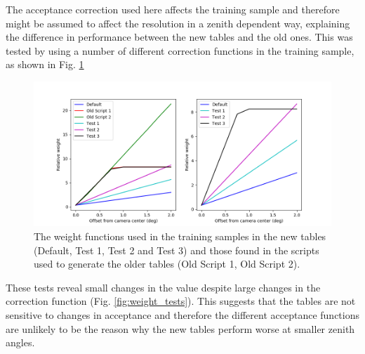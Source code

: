 \documentclass[main.tex]{subfiles}
\begin{document}
The acceptance correction used here affects the training sample and therefore might be assumed to affect the resolution in a zenith dependent way, explaining the difference in performance between the new \disp tables and the old ones. This was tested by using a number of different correction functions in the training sample, as shown in Fig. \ref{fig:weights}

\begin{figure}[htbp]
  \centering
  \includegraphics[width=.78\linewidth]{images/weights}
  \caption[Weight functions for offset from camera center.]{The weight functions used in the training samples in the new tables (Default, Test 1, Test 2 and Test 3) and those found in the scripts used to generate the older tables (Old Script 1, Old Script 2).}
  \label{fig:weights}
\end{figure}

These tests reveal small changes in the \rse value despite large changes in the correction function (Fig. \ref{fig:weight_tests}). This suggests that the \disp tables are not sensitive to changes in acceptance and therefore the different acceptance functions are unlikely to be the reason why the new \disp tables perform worse at smaller zenith angles.
\end{document}
